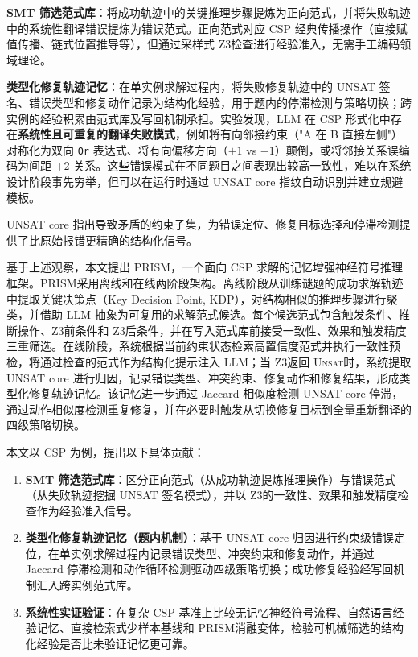 \documentclass[UTF8,a4paper,12pt]{ctexart}
\newcommand{\PRISM}{PRISM}
\newcommand{\unsat}{\textsc{Unsat}}
\newcommand{\zthree}{Z3}
\begin{document}
\textbf{SMT 筛选范式库}：将成功轨迹中的关键推理步骤提炼为正向范式，并将失败轨迹中的系统性翻译错误提炼为错误范式。正向范式对应 CSP 经典传播操作（直接赋值传播、链式位置推导等），但通过采样式 \zthree 检查进行经验准入，无需手工编码领域理论。

\textbf{类型化修复轨迹记忆}：在单实例求解过程内，将失败修复轨迹中的 UNSAT 签名、错误类型和修复动作记录为结构化经验，用于题内的停滞检测与策略切换；跨实例的经验积累由范式库及写回机制承担。实验发现，LLM 在 CSP 形式化中存在\textbf{系统性且可重复的翻译失败模式}，例如将有向邻接约束（"A 在 B 直接左侧"）对称化为双向 \texttt{Or} 表达式、将有向偏移方向（\(+1\) vs \(-1\)）颠倒，或将邻接关系误编码为间距 \(+2\) 关系。这些错误模式在不同题目之间表现出较高一致性，难以在系统设计阶段事先穷举，但可以在运行时通过 UNSAT core 指纹自动识别并建立规避模板。

UNSAT core 指出导致矛盾的约束子集，为错误定位、修复目标选择和停滞检测提供了比原始报错更精确的结构化信号。

基于上述观察，本文提出 \PRISM，一个面向 CSP 求解的记忆增强神经符号推理框架。\PRISM 采用离线和在线两阶段架构。离线阶段从训练谜题的成功求解轨迹中提取关键决策点（Key Decision Point, KDP），对结构相似的推理步骤进行聚类，并借助 LLM 抽象为可复用的求解范式候选。每个候选范式包含触发条件、推断操作、\zthree 前条件和 \zthree 后条件，并在写入范式库前接受一致性、效果和触发精度三重筛选。在线阶段，系统根据当前约束状态检索高置信度范式并执行一致性预检，将通过检查的范式作为结构化提示注入 LLM；当 \zthree 返回 \unsat 时，系统提取 UNSAT core 进行归因，记录错误类型、冲突约束、修复动作和修复结果，形成类型化修复轨迹记忆。该记忆进一步通过 Jaccard 相似度检测 UNSAT core 停滞，通过动作相似度检测重复修复，并在必要时触发从切换修复目标到全量重新翻译的四级策略切换。

本文以 CSP 为例，提出以下具体贡献：
\begin{enumerate}
  \item \textbf{SMT 筛选范式库}：区分正向范式（从成功轨迹提炼推理操作）与错误范式（从失败轨迹挖掘 UNSAT 签名模式），并以 \zthree 的一致性、效果和触发精度检查作为经验准入信号。
  \item \textbf{类型化修复轨迹记忆（题内机制）}：基于 UNSAT core 归因进行约束级错误定位，在单实例求解过程内记录错误类型、冲突约束和修复动作，并通过 Jaccard 停滞检测和动作循环检测驱动四级策略切换；成功修复经验经写回机制汇入跨实例范式库。
  \item \textbf{系统性实证验证}：在复杂 CSP 基准上比较无记忆神经符号流程、自然语言经验记忆、直接检索式少样本基线和 \PRISM 消融变体，检验可机械筛选的结构化经验是否比未验证记忆更可靠。
\end{enumerate}
\end{document}
